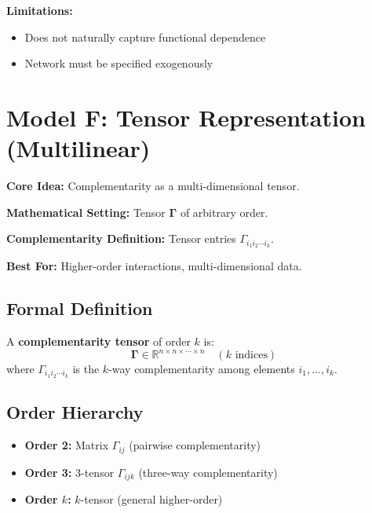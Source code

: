 \textbf{Limitations:}
\begin{itemize}
    \item Does not naturally capture functional dependence
    \item Network must be specified exogenously
\end{itemize}

\section{Model F: Tensor Representation (Multilinear)}
\label{sec:model-f}

\begin{tcolorbox}[colback=green!5!white,colframe=green!75!black,title=\textbf{Model F Overview}]
\textbf{Core Idea:} Complementarity as a multi-dimensional tensor.

\textbf{Mathematical Setting:} Tensor $\boldsymbol{\Gamma}$ of arbitrary order.

\textbf{Complementarity Definition:} Tensor entries $\Gamma_{i_1 i_2 \cdots i_k}$.

\textbf{Best For:} Higher-order interactions, multi-dimensional data.
\end{tcolorbox}

\subsection{Formal Definition}

\begin{definition}
A \textbf{complementarity tensor} of order $k$ is:
\begin{equation}
\boldsymbol{\Gamma} \in \mathbb{R}^{n \times n \times \cdots \times n} \quad (k \text{ indices})
\end{equation}
where $\Gamma_{i_1 i_2 \cdots i_k}$ is the $k$-way complementarity among elements $i_1, \ldots, i_k$.
\end{definition}

\subsection{Order Hierarchy}

\begin{itemize}
    \item \textbf{Order 2:} Matrix $\Gamma_{ij}$ (pairwise complementarity)
    \item \textbf{Order 3:} 3-tensor $\Gamma_{ijk}$ (three-way complementarity)
    \item \textbf{Order $k$:} $k$-tensor (general higher-order)
\end{itemize}

